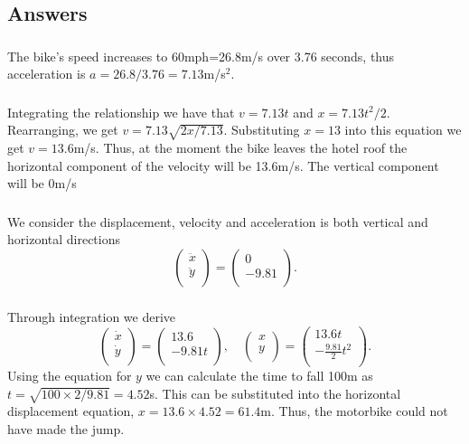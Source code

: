\documentclass[10pt]{article}
\newcommand{\bb}{\begin{equation}}
\newcommand{\ee}{\end{equation}}
\begin{document}
\begin{Answ}
\subsection{Answers}
\subsubsection{}
The bike's speed increases to 60mph=26.8m/s over 3.76 seconds, thus acceleration is $a=26.8/3.76=7.13$m/s$^2$.
\subsubsection{}
Integrating the relationship we have that $v=7.13t$ and $x=7.13t^2/2$. Rearranging, we get $v=7.13\sqrt{2x/7.13}$. Substituting $x=13$ into this equation we get $v=13.6$m/s. Thus, at the moment the bike leaves the hotel roof the horizontal component of the velocity will be 13.6m/s. The vertical component will be 0m/s
\subsubsection{}
We consider the displacement, velocity and acceleration is both vertical and horizontal directions
\bb
\left(
\begin{array}{c}
\ddot{x}\\
\ddot{y}\\
\end{array}
\right)=\left(
\begin{array}{c}
0\\
-9.81\\
\end{array}
\right).
\ee
\subsubsection{}
Through integration we derive
\bb
\left(
\begin{array}{c}
\dot{x}\\
\dot{y}\\
\end{array}
\right)=\left(
\begin{array}{c}
13.6\\
-9.81t\\
\end{array}
\right), \quad \left(
\begin{array}{c}
x\\
y\\
\end{array}
\right)=\left(
\begin{array}{c}
13.6t\\
-\frac{9.81}{2}t^2\\
\end{array}
\right).
\ee
Using the equation for $y$ we can calculate the time to fall 100m as $t=\sqrt{100\times 2/9.81}=4.52$s. This can be substituted into the horizontal displacement equation, $x=13.6 \times 4.52=61.4$m. Thus, the motorbike could not have made the jump.

\end{Answ}
\end{document}
